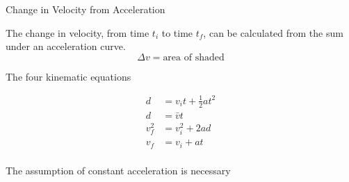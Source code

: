 \documentclass[avery5371,grid]{flashcards}
\begin{document}
\begin{flashcard}[Application]{Change in Velocity from Acceleration}
\vspace{\fill}
\begin{minipage}{0.6\linewidth}
    The change in velocity, from time $t_i$ to time $t_f$,
        can be calculated from the sum under an acceleration curve.
    \begin{displaymath}
        \Delta v = \text{area of shaded}
    \end{displaymath}
\end{minipage}
\begin{minipage}{0.35\linewidth}
    \begin{center}
    \end{center}
\end{minipage}
\vspace{\fill}
\end{flashcard}

\begin{flashcard}[Application]{The four kinematic equations}
\vspace{\fill}
\begin{minipage}{0.4\linewidth}
    \begin{align*}
        d  &= v_i t + \frac{1}{2} a t^2 \\
        d  &= \bar{v} t \\
        v_f^2 &= v_i^2 + 2 a d \\
        v_f   &= v_i + a t \\
    \end{align*}
\end{minipage}
\begin{minipage}{0.5\linewidth}
    The assumption of constant acceleration is necessary
\end{minipage}
\vspace{\fill}
\end{flashcard}
\end{document}
